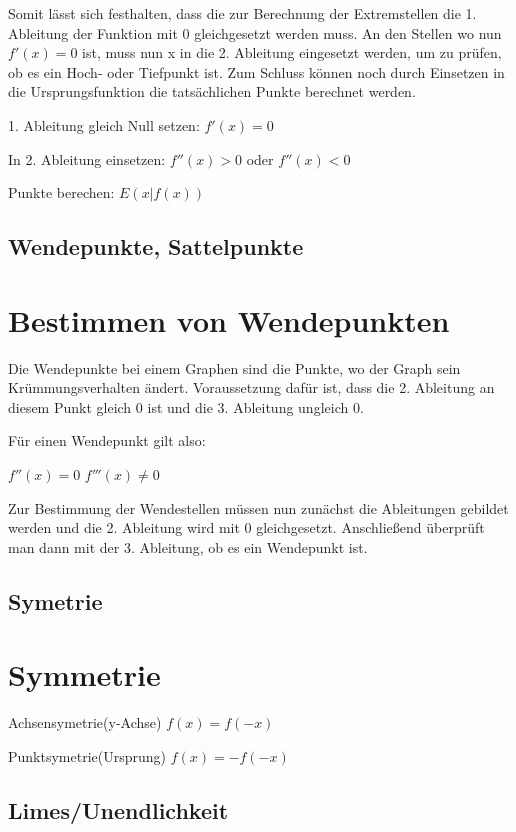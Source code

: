 Somit lässt sich festhalten, dass die zur Berechnung der Extremstellen die 1. Ableitung der Funktion
mit $0$ gleichgesetzt werden muss. An den Stellen wo nun $f'(x) = 0$ ist, muss nun x in die 2. Ableitung
eingesetzt werden, um zu prüfen, ob es ein Hoch- oder Tiefpunkt ist.
Zum Schluss können noch durch Einsetzen in die Ursprungsfunktion die tatsächlichen Punkte
berechnet werden.
\newline

1. Ableitung gleich Null setzen: $f'(x) = 0$

In 2. Ableitung einsetzen: $f''(x) > 0$ oder $f''(x) < 0$

Punkte berechen: $E( x | f(x) )$

\subsection{Wendepunkte, Sattelpunkte}

\section*{Bestimmen von Wendepunkten}
Die Wendepunkte bei einem Graphen sind die Punkte, wo der Graph sein Krümmungsverhalten ändert.
Voraussetzung dafür ist, dass die 2. Ableitung an diesem Punkt gleich $0$ ist und die 3. Ableitung ungleich $0$.
\newline

Für einen Wendepunkt gilt also:

$f''(x) = 0$
$f'''(x) \neq 0$
\newline

Zur Bestimmung der Wendestellen müssen nun zunächst die Ableitungen gebildet werden und
die 2. Ableitung wird mit 0 gleichgesetzt. Anschließend überprüft man dann mit der 3. Ableitung,
ob es ein Wendepunkt ist.

\subsection{Symetrie}

\section*{Symmetrie}
Achsensymetrie(y-Achse) $f(x) = f(-x)$

Punktsymetrie(Ursprung) $f(x) = -f(-x)$

\subsection{Limes/Unendlichkeit}

